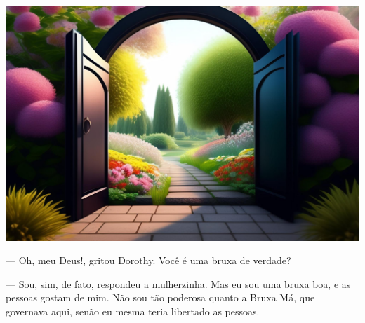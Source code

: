 \begin{conteudo}
\begin{conteudo}
\begin{conteudo}
\begin{conteudo}
\begin{conteudo}

\begin{myquote}
\textit{}

\begin{center}
\includegraphics[width=\textwidth]{media/image22b.jpg}
\end{center}

--- Oh, meu Deus!, gritou Dorothy. Você é uma bruxa de verdade?

--- Sou, sim, de fato, respondeu a mulherzinha. Mas eu sou uma bruxa boa, e
as pessoas gostam de mim. Não sou tão poderosa quanto a Bruxa Má, 
que governava aqui, senão eu mesma teria libertado as pessoas.


\end{myquote}
\end{conteudo}
\end{conteudo}
\end{conteudo}
\end{conteudo}
\end{conteudo}
